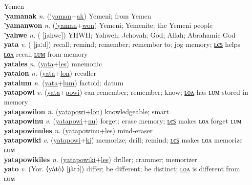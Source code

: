 Yemen \label{'yaman} \\
\textbf{'yamanak} \textit{n.} (\hyperref['yaman]{'yaman}+\hyperref[ak]{ak})
Yemeni; from Yemen \label{'yamanak} \\
\textbf{'yamanwon} \textit{n.} (\hyperref['yaman]{'yaman}+\hyperref[won]{won})
Yemeni; Yemenite; the Yemeni people \label{'yamanwon} \\
\textbf{'yahwe} \textit{n.} ( [jahwe])
YHWH; Yahweh; Jehovah; God; Allah; Abrahamic God \label{'yahwe} \\
\textbf{yata} \textit{v.} ( [jaːd])
recall; remind; remember; remember to; jog memory; \hyperref[yatales]{ʟєꜱ} helps \hyperref[yatalon]{ʟᴏᴧ} recall \hyperref[yatalum]{ʟᴜᴍ} from memory \label{yata} \\
\textbf{yatales} \textit{n.} (\hyperref[yata]{yata}+\hyperref[les]{les})
mnemonic \label{yatales} \\
\textbf{yatalon} \textit{n.} (\hyperref[yata]{yata}+\hyperref[lon]{lon})
recaller \label{yatalon} \\
\textbf{yatalum} \textit{n.} (\hyperref[yata]{yata}+\hyperref[lum]{lum})
factoid; datum \label{yatalum} \\
\textbf{yatapowi} \textit{v.} (\hyperref[yata]{yata}+\hyperref[powi]{powi})
can remember; remember; know; \hyperref[yatapowilon]{ʟᴏᴧ} has ʟᴜᴍ stored in memory \label{yatapowi} \\
\textbf{yatapowilon} \textit{n.} (\hyperref[yatapowi]{yatapowi}+\hyperref[lon]{lon})
knowledgeable; smart \label{yatapowilon} \\
\textbf{yatapowinu} \textit{v.} (\hyperref[yatapowi]{yatapowi}+\hyperref[nu]{nu})
forget; erase memory; \hyperref[yatapowinules]{ʟєꜱ} makes ʟᴏᴧ forget ʟᴜᴍ \label{yatapowinu} \\
\textbf{yatapowinules} \textit{n.} (\hyperref[yatapowinu]{yatapowinu}+\hyperref[les]{les})
mind-eraser \label{yatapowinules} \\
\textbf{yatapowiki} \textit{v.} (\hyperref[yatapowi]{yatapowi}+\hyperref[ki]{ki})
memorize; drill; remind; \hyperref[yatapowikiles]{ʟєꜱ} makes ʟᴏᴧ memorize ʟᴜᴍ \label{yatapowiki} \\
\textbf{yatapowikiles} \textit{n.} (\hyperref[yatapowiki]{yatapowiki}+\hyperref[les]{les})
driller; crammer; memorizer \label{yatapowikiles} \\
\textbf{yato} \textit{v.} (Yor. ⟨yàtọ̀⟩ [jàtɔ̀])
differ; be different; be distinct; \hyperref[yatolon]{ʟᴏᴧ} is different from ʟᴜᴍ \label{yato} \\
